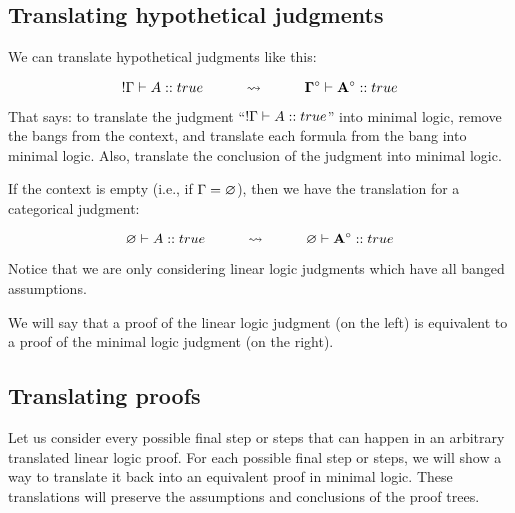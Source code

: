 \documentclass[../../../main.tex]{subfiles}
\begin{document}
\subsection{Translating hypothetical judgments}

We can translate hypothetical judgments like this:

\begin{equation*}
  \bang/\context/ \ndturnstile/ A :: true
  \hskip 1cm \rightsquigarrow \hskip 1cm
  \nd{\context/}^{\circ} \ndturnstile/ \nd{A}^{\circ} :: true
\end{equation*}

That says: to translate the judgment ``$\bang/\context/ \ndturnstile/ A :: true$'' into minimal logic, remove the bangs from the context, and translate each formula from the bang into minimal logic. Also, translate the conclusion of the judgment into minimal logic.

If the context is empty (i.e., if $\context/ = \emptyassumptions/$), then we have the translation for a categorical judgment:

\begin{equation*}
  \emptyassumptions/ \ndturnstile/ A :: true
  \hskip 1cm \rightsquigarrow \hskip 1cm
  \emptyassumptions/ \ndturnstile/ \nd{A}^{\circ} :: true
\end{equation*}

\noindent
Notice that we are only considering linear logic judgments which have all banged assumptions.

We will say that a proof of the linear logic judgment (on the left) is equivalent to a proof of the minimal logic judgment (on the right).


\subsection{Translating proofs}

Let us consider every possible final step or steps that can happen in an arbitrary translated linear logic proof. For each possible final step or steps, we will show a way to translate it back into an equivalent proof in minimal logic. These translations will preserve the assumptions and conclusions of the proof trees.
\end{document}
